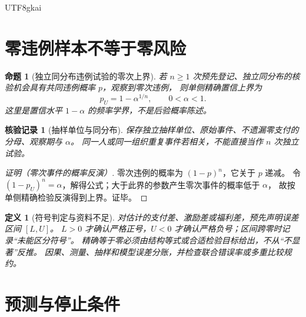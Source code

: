 \documentclass[12pt,a4paper,openany]{report}
\newtheorem{definition}{定义}[chapter]
\newtheorem{proposition}{命题}[chapter]
\newtheorem{Certificate}{核验记录}[chapter]
\begin{document}
\begin{CJK*}{UTF8}{gkai}
\section{零违例样本不等于零风险}

\begin{proposition}[独立同分布违例试验的零次上界]
\label{prop:zero-failure}
若 $n\ge1$ 次预先登记、独立同分布的核验机会具有共同违例概率 $p$，观察到零次违例，
则单侧精确置信上界为
\[
 p_U=1-\alpha^{1/n},\qquad 0<\alpha<1.
\]
这里是置信水平 $1-\alpha$ 的频率学界，不是后验概率陈述。
\end{proposition}
\begin{Certificate}[抽样单位与同分布]
保存独立抽样单位、原始事件、不遗漏零支付的分母、观察期与 $\alpha$。
同一人或同一组织重复事件若相关，不能直接当作 $n$ 次独立试验。
\end{Certificate}
\begin{proof}[证明（零次事件的概率反演）]
零次违例的概率为 $(1-p)^n$，它关于 $p$ 递减。
令 $(1-p_U)^n=\alpha$，解得公式；大于此界的参数产生零次事件的概率低于 $\alpha$，
故按单侧精确检验反演得到上界。证毕。
\end{proof}

\begin{definition}[符号判定与资料不足]
对估计的支付差、激励差或福利差，预先声明误差区间 $[L,U]$。
$L>0$ 才确认严格正号，$U<0$ 才确认严格负号；区间跨零时记录“未能区分符号”。
精确等于零必须由结构等式或合适检验目标给出，不从“不显著”反推。
因果、测量、抽样和模型误差分账，并检查联合错误率或多重比较规约。
\end{definition}

\section{预测与停止条件}


\end{CJK*}
\end{document}

